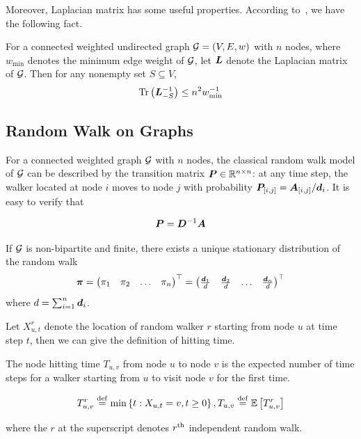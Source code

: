 \documentclass[sigconf]{acmart}
\begin{document}
Moreover, Laplacian matrix has some useful properties. According to~\cite{LiPeShYiZh19}, we have the following fact.
\begin{fact}\label{fact:trace-lap}
    For a connected weighted undirected graph \(\mathcal{G}=(V,E,w)\) with \(n\) nodes, where \(w_{\min}\) denotes the minimum edge weight of \(\mathcal{G}\), let \(\boldsymbol{L}\) denote the Laplacian matrix of \(\mathcal{G}\).
    Then for any nonempty set \(S\subseteq V\),
    \[\mathrm{Tr}\left(\boldsymbol{L}_{-S}^{-1}\right)\le n^2w_{\min}^{-1}\]
\end{fact}

\subsection{Random Walk on Graphs}\label{subsec:random-walk}

For a connected weighted graph \(\mathcal{G}\) with \(n\) nodes, the classical random walk model of \(\mathcal{G}\) can be described by the transition matrix \(\boldsymbol{P}\in\mathbb{R}^{n\times n}\): at any time step, the walker located at node \(i\) moves to node \(j\) with probability \({\boldsymbol{P}_{[i,j]}=\boldsymbol{A}_{[i,j]}}/{\boldsymbol{d}}_i\).
It is easy to verify that

\begin{equation}\label{eq:trs}
    \boldsymbol{P}=\boldsymbol{D}^{-1}\boldsymbol{A}
\end{equation}

If \(\mathcal{G}\) is non-bipartite and finite, there exists a unique stationary distribution of the random walk
\[
    \boldsymbol{\pi}=\begin{pmatrix}
        \pi_1 & \pi_2 & \dots & \pi_n
    \end{pmatrix}^\top=\begin{pmatrix}
        \frac{\boldsymbol{d}_1}{d} & \frac{\boldsymbol{d}_2}{d} & \dots & \frac{\boldsymbol{d}_n}{d}
    \end{pmatrix}^\top
\]
where \(d=\sum_{i=1}^n\boldsymbol{d}_i\).

Let \(X_{u,t}^r\) denote the location of random walker \(r\) starting from node \(u\) at time step \(t\), then we can give the definition of hitting time.

The node hitting time \(T_{u,v}\) from node \(u\) to node \(v\) is the expected number of time steps for a walker starting from \(u\) to visit node \(v\) for the first time.

\begin{definition}\label{def:hitting-time-single}
    \[T_{u,v}^r\stackrel{\mathrm{def}}{=}\min\left\{t:X_{u,t}=v,t\ge0 \right\},T_{u,v}\stackrel{\mathrm{def}}{=}\mathbb{E}\left[T_{u,v}^r\right]\]
\end{definition}
where the \(r\) at the superscript denotes \({r}^{\rm{th}}\) independent random walk.
\end{document}
